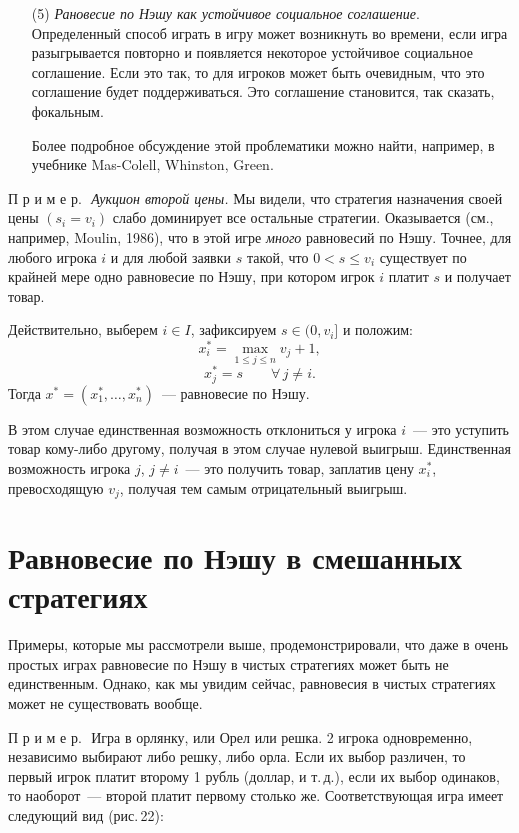 \documentclass[12pt]{article}
\begin{document}
{\begin{itemize}
\item[(5)] {\it Рановесие по Нэшу  как устойчивое социальное
соглашение}.  Определенный способ играть в игру может возникнуть во
времени, если игра разыгрывается повторно и появляется некоторое
устойчивое социальное соглашение. Если это так, то для игроков может
быть очевидным, что это соглашение будет поддерживаться. Это
соглашение становится, так сказать, фокальным.

Более подробное обсуждение этой проблематики можно найти, например,
в учебнике Mas-Colell, Whinston, Green. \end{itemize}
\smallskip

П р и м е р.\,\, {\it Аукцион второй цены.} Мы видели, что стратегия
назначения своей цены $(s_i=v_i)$ слабо доминирует все остальные
стратегии. Оказывается (см., например, Moulin, 1986), что в этой
игре {\it много} равновесий по Нэшу. Точнее, для любого игрока $i$ и
для любой заявки $s$ такой, что $0<s\leq v_i$ существует по крайней
мере одно равновесие по Нэшу, при котором игрок $i$ платит $s$ и
получает товар.

Действительно, выберем $i\in I$, зафиксируем $s\in(0,v_i]$ и
положим:
$$
x^*_i=\max_{1\leq j\leq n} v_j+1,
$$
$$
x^*_j=s\qquad \forall\, j\ne i.
$$
Тогда $x^*=(x^*_1,\ldots,x^*_n)$~--- равновесие по Нэшу.

В этом случае единственная возможность отклониться у игрока $i$~---
это уступить товар кому-либо другому, получая в этом случае нулевой
выигрыш. Единственная возможность игрока $j$, $j\ne i$~--- это
получить товар, заплатив цену $x^*_i$, превосходящую $v_j$, получая
тем самым отрицательный выигрыш.

\section{Равновесие по Нэшу в смешанных стратегиях}

Примеры, которые мы рассмотрели выше, продемонстрировали, что даже в
очень простых играх равновесие по Нэшу в чистых стратегиях может
быть не единственным.  Однако, как мы увидим сейчас, равновесия в
чистых стратегиях может не существовать вообще.
\smallskip

П р и м е р.\,\, Игра в орлянку, или Орел или решка. 2 игрока
одновременно, независимо выбирают либо решку, либо орла. Если их
выбор различен, то первый игрок платит второму 1 рубль (доллар, и
т.\,д.), если их выбор одинаков, то наоборот~--- второй платит
первому столько же. Соответствующая игра имеет следующий вид
(рис.\,22):

}
\end{document}
